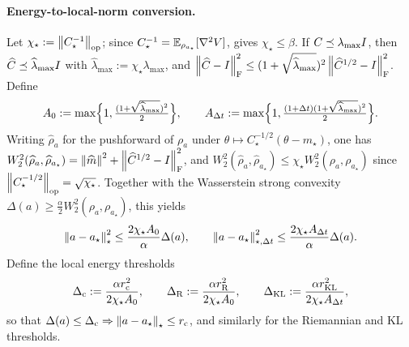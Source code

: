 \paragraph{Energy-to-local-norm conversion.}
Let $\chi_\star:=\left\lVert C_\star^{-1}\right\rVert_{\mathrm{op}}$; since $C_\star^{-1}=\mathbb{E}_{\rho_{a_\star}}[\nabla^2V]$,
 gives $\chi_\star\leq\beta$. If $C\preceq\lambda_{\max}I$,
then $\widehat C\preceq\widehat\lambda_{\max}I$ with $\widehat\lambda_{\max}:=\chi_\star\lambda_{\max}$,
and $\left\lVert \widehat C-I\right\rVert_{\mathrm{F}}^2\leq(1+\sqrt{\widehat\lambda_{\max}})^2\left\lVert \widehat C^{1/2}-I\right\rVert_{\mathrm{F}}^2$.
Define
\[
    A_0:=\max\Bigl\{1,\tfrac{(1+\sqrt{\widehat\lambda_{\max}})^2}2\Bigr\},
    \qquad
    A_{\Delta t}:=\max\Bigl\{1,\tfrac{(1+\Delta t)(1+\sqrt{\widehat\lambda_{\max}})^2}2\Bigr\}.
\]
Writing $\widehat\rho_a$ for the pushforward of $\rho_a$ under
$\theta\mapsto C_\star^{-1/2}(\theta-m_\star)$, one has
$W_2^2(\widehat\rho_a,\widehat\rho_{a_\star})=\left\lVert \widehat m\right\rVert^2+\left\lVert \widehat C^{1/2}-I\right\rVert_{\mathrm{F}}^2$, and
$W_2^2(\widehat\rho_a,\widehat\rho_{a_\star})\leq\chi_\star W_2^2(\rho_a,\rho_{a_\star})$
since $\left\lVert C_\star^{-1/2}\right\rVert_{\mathrm{op}}=\sqrt{\chi_\star}$. Together with the Wasserstein strong
convexity $\Delta(a)\geq\tfrac\alpha2W_2^2(\rho_a,\rho_{a_\star})$, this yields
\[
    \left\lVert a-a_\star\right\rVert_\star^2\leq\frac{2\chi_\star A_0}\alpha\Delta(a),
    \qquad
    \left\lVert a-a_\star\right\rVert_{\star,\Delta t}^2\leq\frac{2\chi_\star A_{\Delta t}}\alpha\Delta(a).
\]
Define the local energy thresholds
\begin{equation}
\label{eq:local-thresholds}
    \Delta_{\mathrm c}:=\frac{\alpha r_{\mathrm c}^2}{2\chi_\star A_0},
    \qquad
    \Delta_{\mathrm{R}}:=\frac{\alpha r_{\mathrm{R}}^2}{2\chi_\star A_0},
    \qquad
    \Delta_{\mathrm{KL}}:=\frac{\alpha r_{\mathrm{KL}}^2}{2\chi_\star A_{\Delta t}},
\end{equation}
so that $\Delta(a)\leq\Delta_{\mathrm c}\Rightarrow\left\lVert a-a_\star\right\rVert_\star\leq r_{\mathrm c}$, and
similarly for the Riemannian and KL thresholds.

